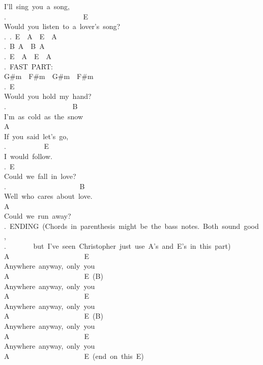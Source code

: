 {I'll\ sing\ you\ a\ song,\ \\
. \ \ \ \ \ \ \ \ \ \ \ \ \ \ \ \ \ \ \ \ \ E\\
Would\ you\ listen\ to\ a\ lover's\ song?\\
.\
.\
E\ \ A\ \ E\ \ A\ \ \\
.\
B\ A\ \ B\ A\\
.\
E\ \ A\ \ E\ \ A\ \ \\
.\
FAST\ PART:\\
G\#m\ \ F\#m\ \ G\#m\ \ F\#m\ \\
.\
E\\
Would\ you\ hold\ my\ hand?\\
. \ \ \ \ \ \ \ \ \ \ \ \ \ \ \ \ \ \ B\\
I'm\ as\ cold\ as\ the\ snow\\
A\\
If\ you\ said\ let's\ go,\ \\
. \ \ \ \ \ \ \ \ \ \ E\\
I\ would\ follow.\\
.\
E\\
Could\ we\ fall\ in\ love?\\
. \ \ \ \ \ \ \ \ \ \ \ \ \ \ \ \ \ \ \ \ B\\
Well\ who\ cares\ about\ love.\\
A\\
Could\ we\ run\ away?\\
.\
ENDING\ (Chords\ in\ parenthesis\ might\ be\ the\ bass\ notes.\ Both\ sound\ good,\\
. \ \ \ \ \ \ \ but\ I've\ seen\ Christopher\ just\ use\ A's\ and\ E's\ in\ this\ part)\\
A\ \ \ \ \ \ \ \ \ \ \ \ \ \ \ \ \ \ \ \ \ E\\
Anywhere\ anyway,\ only\ you\\
A\ \ \ \ \ \ \ \ \ \ \ \ \ \ \ \ \ \ \ \ \ E\ (B)\\
Anywhere\ anyway,\ only\ you\\
A\ \ \ \ \ \ \ \ \ \ \ \ \ \ \ \ \ \ \ \ \ E\\
Anywhere\ anyway,\ only\ you\\
A\ \ \ \ \ \ \ \ \ \ \ \ \ \ \ \ \ \ \ \ \ E\ (B)\\
Anywhere\ anyway,\ only\ you\\
A\ \ \ \ \ \ \ \ \ \ \ \ \ \ \ \ \ \ \ \ \ E\\
Anywhere\ anyway,\ only\ you\\
A\ \ \ \ \ \ \ \ \ \ \ \ \ \ \ \ \ \ \ \ \ E\ (end\ on\ this\ E)\ }
